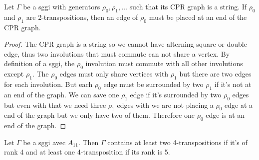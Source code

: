 \begin{lemma}\label{rho0atEnd}
  Let $\Gamma$ be a sggi with generators $\rho_0, \rho_1, \dots$ such that its CPR graph is a string. If $\rho_0$ and $\rho_1$ are 2-transpositions, then an edge of $\rho_0$ must be placed at an end of the CPR graph.
\end{lemma}

\begin{proof}
  The CPR graph is a string so we cannot have alterning square or double edge, thus two involutions that must commute can not share a vertex. By definition of a sggi, the $\rho_0$ involution must commute with all other involutions except $\rho_1$. The $\rho_0$ edges must only share vertices with $\rho_1$ but there are two edges for each involution. But each $\rho_0$ edge must be surrounded by two $\rho_1$ if it's not at an end of the graph. We can save one $\rho_1$ edge if it's surrounded by two $\rho_0$ edges but even with that we need three $\rho_1$ edges with we are not placing a $\rho_0$ edge at a end of the graph but we only have two of them. Therefore one $\rho_0$ edge is at an end of the graph.
\end{proof}

\begin{lemma}
  Let $\Gamma$ be a sggi avec $A_{11}$. Then $\Gamma$ contains at least two 4-transpositions if it's of rank 4 and at least one 4-transposition if its rank is 5.
\end{lemma}

